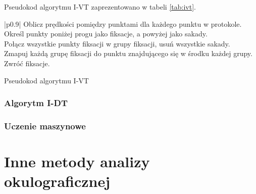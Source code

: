 Pseudokod algorytmu I-VT zaprezentowano w tabeli \ref{tab:ivt}.
\begin{table}[H]
    \begin{tttabular}{|p{0.9\linewidth}|}
        \hline
        Oblicz prędkości pomiędzy punktami dla każdego punktu w protokole.\\
        \smallskip
        Określ punkty poniżej progu jako fiksacje, a powyżej jako sakady.\\
        \smallskip
        Połącz wszystkie punkty fiksacji w grupy fiksacji, usuń wszystkie sakady.\\
        \smallskip
        Zmapuj każdą grupę fiksacji do punktu znajdującego się w środku każdej grupy.\\
        \smallskip
        Zwróć fiksacje.\\
        \hline
    \end{tttabular}
    \caption{Pseudokod algorytmu I-VT}
    \label{tab:ivt}
\end{table}
\subsubsection{Algorytm I-DT}
\subsubsection{Uczenie maszynowe}
\section{Inne metody analizy okulograficznej}